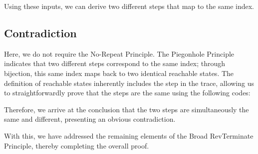 Using these inputs, we can derive two different steps that map to the same index.

\subsection{ Contradiction }
Here, we do not require the No-Repeat Principle.  
The Piegonhole Principle indicates that two different steps correspond to the same index; through bijection, this same index maps back to two identical reachable states.
The definition of reachable states inherently includes the step in the trace, allowing us to straightforwardly prove that the steps are the same using the following codes:


Therefore, we arrive at the conclusion that the two steps are simultaneously the same and different, presenting an obvious contradiction.

With this, we have addressed the remaining elements of the Broad RevTerminate Principle, thereby completing the overall proof.
